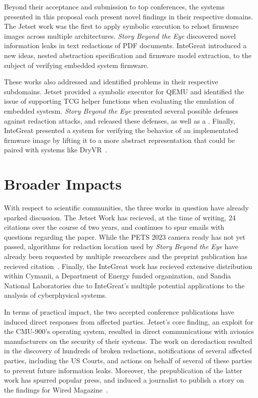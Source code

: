 Beyond their acceptance and submission to top conferences, the systems presented in this proposal each present novel findings in their respective domains. 
The Jetset work was the first to apply symbolic execution to rehost firmware images across multiple architectures.
\emph{Story Beyond the Eye} discovered novel information leaks in text redactions of PDF documents.
InteGreat introduced a new ideas, nested abstraction specification and firmware model extraction, to the subject of verifying embedded system firmware.

These works also addressed and identified problems in their respective subdomains.
Jetset provided a symbolic executor for QEMU and identified the issue of supporting TCG helper functions when evaluating the emulation of embedded systesm.
\emph{Story Beyond the Eye} presented several possible defenses against redaction attacks, and released these defenses, as well as a .
Finally, InteGreat presented a system for verifying the behavior of an implementated firmware image by lifting it to a more abstract representation that could be paired with systems like DryVR~\cite{fan2017dryvr}.


\section{Broader Impacts}

With respect to scientific communities, the three works in question have already sparked discussion.
The Jetset Work has recieved, at the time of writing, 24 citations over the course of two years, and continues to spur emails with questions regarding the paper.
While the PETS 2023 camera ready has not yet passed, algorithms for redaction location used by \emph{Story Beyond the Eye} have already been requested by multiple researchers and the preprint publication has recieved citation~\cite{rust2022language}.
Finally, the InteGreat work has recieved extensive distribution within Cymanii, a Department of Energy funded organization, and Sandia National Laboratories due to InteGreat's multiple potential applications to the analysis of cyberphysical systems.

In terms of practical impact, the two accepted conference publications have induced direct responses from affected parties.
Jetset's core finding, an exploit for the CMU-900's operating system, resulted in direct communications with avionics manufacturers on the security of their systems.
The work on deredaction resulted in the discovery of hundreds of broken redactions, notifications of several affected parties, including the US Courts, and actions on behalf of several of these parties to prevent future information leaks. 
Moreover, the prepublication of the latter work has spurred popular press, and induced a journalist to publish a story on the findings for Wired Magazine~\cite{wiredredact}.
